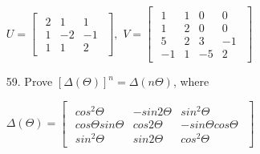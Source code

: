 \documentclass[11pt]{amsbook}
\begin{document}
\begin{enumerate}
	$
	U=
	\begin{bmatrix}
	{\begin{array}{rrr}
   	2 & 1 & 1\\
	1 & -2 & -1\\
	1 & 1& 2     \end{array} }
	\end{bmatrix}, 
	$
	$
	V=
	\begin{bmatrix}
	{\begin{array}{rrrr}
   	1 & 1 & 0 & 0\\
	1 & 2 & 0 & 0\\
	5 & 2 & 3 & -1\\
	-1 & 1 & -5 & 2 \end{array} }
	\end{bmatrix}
	$
	\item[59.]
	Prove $[\Delta(\Theta)]^n = \Delta(n\Theta)$, where
	
	$
	\Delta(\Theta)=
	\begin{bmatrix}
	{\begin{array}{ccc}
   	cos^2\Theta & -sin 2\Theta & sin^2\Theta\\
	cos\Theta sin\Theta & cos 2\Theta & -sin\Theta cos\Theta\\
	sin^2\Theta & sin 2\Theta & cos^2\Theta    \end{array} }
	\end{bmatrix}
	$
\end{enumerate}
\end{document}
